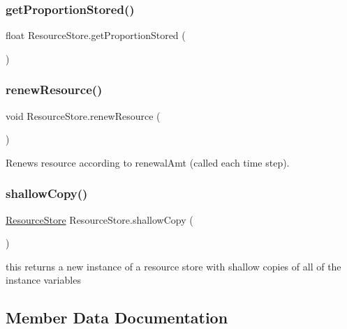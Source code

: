 \subsubsection{\texorpdfstring{get\+Proportion\+Stored()}{getProportionStored()}}
{\footnotesize\ttfamily float Resource\+Store.\+get\+Proportion\+Stored (\begin{DoxyParamCaption}{ }\end{DoxyParamCaption})}

\mbox{\label{class_resource_store_a9c37fdfe13469bed6232c3ed1418d313}} 
\subsubsection{\texorpdfstring{renew\+Resource()}{renewResource()}}
{\footnotesize\ttfamily void Resource\+Store.\+renew\+Resource (\begin{DoxyParamCaption}{ }\end{DoxyParamCaption})}



Renews resource according to renewal\+Amt (called each time step). 

\mbox{\label{class_resource_store_a7a609776888726de6169f1e9b90dd36f}} 
\subsubsection{\texorpdfstring{shallow\+Copy()}{shallowCopy()}}
{\footnotesize\ttfamily \mbox{\hyperlink{class_resource_store}{Resource\+Store}} Resource\+Store.\+shallow\+Copy (\begin{DoxyParamCaption}{ }\end{DoxyParamCaption})}



this returns a new instance of a resource store with shallow copies of all of the instance variables 



\subsection{Member Data Documentation}
\mbox{\label{class_resource_store_aadc1eae620b2c81bd4d16de13ca7f435}} 
